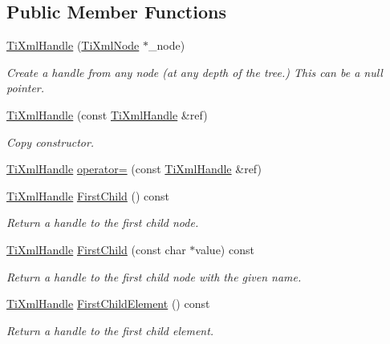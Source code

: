\subsection*{Public Member Functions}
\begin{DoxyCompactItemize}
\item 
\hyperlink{classTiXmlHandle_aba18fd7bdefb942ecdea4bf4b8e29ec8}{TiXmlHandle} (\hyperlink{classTiXmlNode}{TiXmlNode} $\ast$\_\-node)
\begin{DoxyCompactList}\small\item\em Create a handle from any node (at any depth of the tree.) This can be a null pointer. \item\end{DoxyCompactList}\item 
\hyperlink{classTiXmlHandle_a236d7855e1e56ccc7b980630c48c7fd7}{TiXmlHandle} (const \hyperlink{classTiXmlHandle}{TiXmlHandle} \&ref)
\begin{DoxyCompactList}\small\item\em Copy constructor. \item\end{DoxyCompactList}\item 
\hyperlink{classTiXmlHandle}{TiXmlHandle} \hyperlink{classTiXmlHandle_ad8e5dcf6a87882674203157f29f8e4db}{operator=} (const \hyperlink{classTiXmlHandle}{TiXmlHandle} \&ref)
\item 
\hyperlink{classTiXmlHandle}{TiXmlHandle} \hyperlink{classTiXmlHandle_acdb1faaf88a700b40ca2c8d9aee21139}{FirstChild} () const 
\begin{DoxyCompactList}\small\item\em Return a handle to the first child node. \item\end{DoxyCompactList}\item 
\hyperlink{classTiXmlHandle}{TiXmlHandle} \hyperlink{classTiXmlHandle_a8c61f64ae9365d89c264f289085541f8}{FirstChild} (const char $\ast$value) const 
\begin{DoxyCompactList}\small\item\em Return a handle to the first child node with the given name. \item\end{DoxyCompactList}\item 
\hyperlink{classTiXmlHandle}{TiXmlHandle} \hyperlink{classTiXmlHandle_a24d1112e995e937e4dddb202d4113d4a}{FirstChildElement} () const 
\begin{DoxyCompactList}\small\item\em Return a handle to the first child element. \item\end{DoxyCompactList}\item 

\end{DoxyCompactItemize}
